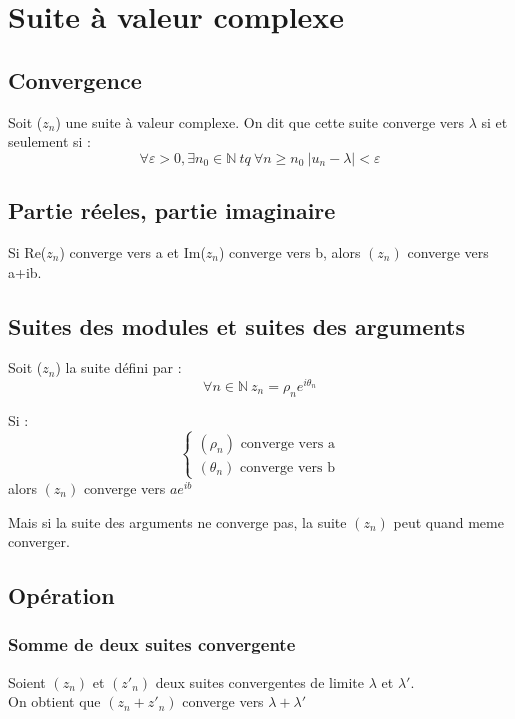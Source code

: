 \chapter{Suite à valeur complexe}
\section{Convergence}
\begin{de}
 Soit ($z_n$) une suite à valeur complexe. On dit que cette suite converge vers $\lambda$ si et seulement si :
$$\forall \varepsilon > 0, \exists n_0 \in \mathbb{N}~ tq~ \forall n \geq n_0~ |u_n -\lambda|<\varepsilon$$
\end{de}
\section{Partie réeles, partie imaginaire}
\begin{prop}
Si Re($z_n$) converge vers a et Im($z_n$) converge vers b, alors $(z_n)$ converge vers a+ib.
\end{prop}
\section{Suites des modules et suites des arguments}
Soit ($z_n$) la suite défini par :
$$\forall n \in \mathbb{N}~ z_n = \rho_ne^{i\theta_n}$$
\begin{prop}
Si :
$$\left\{\begin{array}{l}
    (\rho_n) \mbox{ converge vers a}\\
    (\theta_n) \mbox{ converge vers b}
  \end{array}\right.$$
alors $(z_n)$ converge vers $ae^{ib}$
\end{prop}
Mais si la suite des arguments ne converge pas, la suite $(z_n)$ peut quand meme converger.
\section{Opération}
\subsection{Somme de deux suites convergente}
\begin{prop}
 Soient $(z_n)$ et $(z'_n)$ deux suites convergentes de limite $\lambda$ et $\lambda'$.\\
On obtient que $(z_n+z'_n)$ converge vers $\lambda+\lambda'$
\end{prop}

